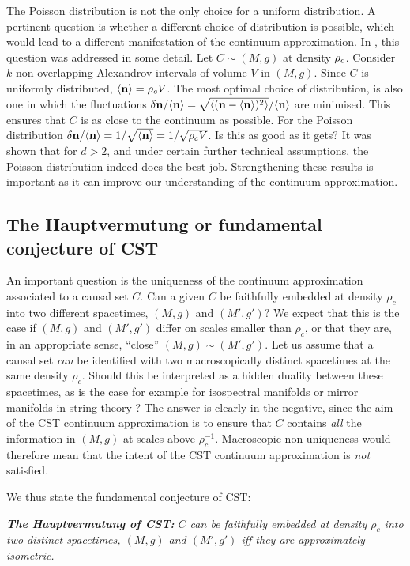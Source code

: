 The Poisson distribution is not the only choice for a uniform distribution.
A pertinent question is whether a different choice of distribution is possible, which would 
lead to a different manifestation of the continuum approximation.   In \cite{aspoisson}, this question was addressed in
some detail.  Let $C \sim (M,g)$  at density $\rho_c$.  Consider $k$ non-overlapping Alexandrov intervals of
volume $V$ in $(M,g)$. Since $C$ is uniformly  distributed,  $\langle {\mathbf n} \rangle = \rho_c V$. The most  optimal choice of
distribution, is also  one in which the fluctuations $\delta \mathbf n/\langle {\mathbf n} \rangle=\sqrt{\langle {(\mathbf n-\langle {\mathbf n} \rangle)^2} \rangle}/{\langle {\mathbf n} \rangle}$ are minimised. This ensures
that $C$ is as close to the continuum as possible. For the Poisson distribution $\delta \mathbf n/\langle {\mathbf n} \rangle = 1/\sqrt{\langle {\mathbf n} \rangle} = 1/\sqrt{\rho_c V}$.  Is this as good as it
gets? It was shown that for $d>2$,  and under certain further technical assumptions, the Poisson distribution indeed
does the best job. Strengthening these results is important as it can improve our understanding of  the continuum approximation. 


\subsection{The Hauptvermutung or fundamental conjecture of CST} 
\label{ssec:haupt} 

An important question is the uniqueness of  the continuum approximation associated to  a causal set $C$.  Can a given
$C$ be faithfully embedded at density $\rho_c$  into two different spacetimes,
$(M,g)$ and $(M',g')$?  We expect that this is the case  if $(M,g) $ and $ (M',g')$ differ
on scales  smaller than 
$\rho_c$, or that they are, in an appropriate sense, ``close'' $(M,g) \sim (M',g')$.   Let us assume that a causal set \emph{can} be identified with two macroscopically distinct spacetimes at the same density
$\rho_c$.  Should this be interpreted as a hidden duality between these spacetimes, as is the case for example for isospectral manifolds
or mirror manifolds in string theory \citep{string}?  The answer is clearly in the negative, since the aim of the CST
continuum approximation is to ensure that $C$ contains \emph{all} the information
in $(M,g)$ at scales above $\rho_c^{-1}$. Macroscopic non-uniqueness would therefore mean that the intent of
the CST  continuum approximation is \emph{not}  satisfied. 

We thus state the fundamental conjecture of CST: 

\textit{\textbf{The Hauptvermutung of CST:}  $C$ can  be faithfully embedded at density $\rho_c$  into two distinct spacetimes,
$(M,g)$ and $(M',g')$  iff  they are approximately isometric.}    

